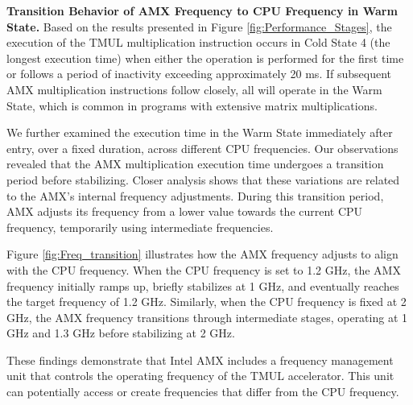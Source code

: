 \textbf{Transition Behavior of AMX Frequency to CPU Frequency in Warm State.}
Based on the results presented in Figure \ref{fig:Performance_Stages}, the execution of the TMUL multiplication instruction occurs in Cold State 4 (the longest execution time) when either the operation is performed for the first time or follows a period of inactivity exceeding approximately 20 ms. If subsequent AMX multiplication instructions follow closely, all will operate in the Warm State, which is common in programs with extensive matrix multiplications.

We further examined the execution time in the Warm State immediately after entry, over a fixed duration, across different CPU frequencies. Our observations revealed that the AMX multiplication execution time undergoes a transition period before stabilizing. Closer analysis shows that these variations are related to the AMX's internal frequency adjustments. During this transition period, AMX adjusts its frequency from a lower value towards the current CPU frequency, temporarily using intermediate frequencies.

Figure \ref{fig:Freq_transition} illustrates how the AMX frequency adjusts to align with the CPU frequency. When the CPU frequency is set to 1.2 GHz, the AMX frequency initially ramps up, briefly stabilizes at 1 GHz, and eventually reaches the target frequency of 1.2 GHz. Similarly, when the CPU frequency is fixed at 2 GHz, the AMX frequency transitions through intermediate stages, operating at 1 GHz and 1.3 GHz before stabilizing at 2 GHz.

These findings demonstrate that Intel AMX includes a frequency management unit that controls the operating frequency of the TMUL accelerator. This unit can potentially access or create frequencies that differ from the CPU frequency.


